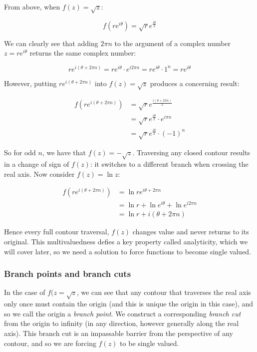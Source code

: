 \documentclass{../../physics_notes}
\begin{document}
From above, when $f(z) = \sqrt{z}$:

\begin{equation*}
f(re^{i\theta}) = \sqrt{r} e^{\frac{i\theta}{2}}
\end{equation*}

We can clearly see that adding $2\pi n$ to the argument of a complex number $z = re^{i\theta}$ returns the same complex number:

\[re^{i(\theta + 2\pi n)} = re^{i\theta}\cdot e^{i 2\pi n} = re^{i\theta}\cdot 1^n = re^{i\theta} \]

However, putting $re^{i(\theta + 2\pi n)}$ into $f(z) = \sqrt{z}$ produces a concerning result:

\begin{align*}
f(re^{i(\theta + 2\pi n)}) &= \sqrt{r} e^{\frac{i(\theta + 2\pi n)}{2}} \\
&= \sqrt{r} e^{\frac{i\theta}{2}}\cdot e^{i \pi n} \\
&= \sqrt{r} e^{\frac{i\theta}{2}}\cdot (-1)^n 
\end{align*}

So for odd $n$, we have that $f(z) = -\sqrt{z}$. Traversing any closed contour results in a change of sign of $f(z)$: it switches to a different branch when crossing the real axis. Now consider $f(z) = \ln{z}$:

\begin{align*}
f(re^{i(\theta + 2\pi n)}) &= \ln{re^{i\theta + 2\pi n}} \\
&= \ln{r} + \ln{e^{i\theta}} + \ln{e^{i 2\pi n}} \\
&= \ln{r} + i(\theta + 2\pi n)
\end{align*}

Hence every full contour traversal, $f(z)$ changes value and never returns to its original. This multivaluedness defies a key property called analyticity, which we will cover later, so we need a solution to force functions to become single valued. 

\subsubsection*{Branch points and branch cuts }

In the case of $f(z = \sqrt{z}$, we can see that any contour that traverses the real axis only once must contain the origin (and this is unique the origin in this case), and so  we call the origin a \emph{branch point}. We construct a corresponding \emph{branch cut} from the origin to infinity (in any direction, however generally along the real axis). This branch cut is an impassable barrier from the perspective of any contour, and so we are forcing $f(z)$ to be single valued. 
\end{document}
